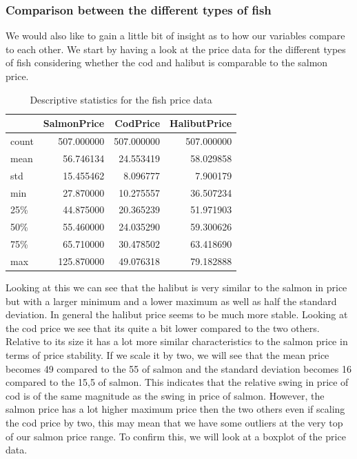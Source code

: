 \subsubsection{Comparison between the different types of fish}\label{Comparison between the different types of fish}
We would also like to gain a little bit of insight as to how our variables compare to each other. We start by having a look at the price data for the different types of fish considering whether the cod and halibut is comparable to the salmon price.

\begin{table}[H]
    \begin{center}
    \begin{tabular}{lrrr}
        \toprule
        {} &  SalmonPrice &    CodPrice &  HalibutPrice \\
        \midrule
        count &   507.000000 &  507.000000 &    507.000000 \\
        mean  &    56.746134 &   24.553419 &     58.029858 \\
        std   &    15.455462 &    8.096777 &      7.900179 \\
        min   &    27.870000 &   10.275557 &     36.507234 \\
        25\%   &    44.875000 &   20.365239 &     51.971903 \\
        50\%   &    55.460000 &   24.035290 &     59.300626 \\
        75\%   &    65.710000 &   30.478502 &     63.418690 \\
        max   &   125.870000 &   49.076318 &     79.182888 \\
        \bottomrule
    \end{tabular}
    \end{center}
    \caption{Descriptive statistics for the fish price data}
\end{table}

Looking at this we can see that the halibut is very similar to the salmon in price but with a larger minimum and a lower maximum as well as half the standard deviation. In general the halibut price seems to be much more stable. Looking at the cod price we see that its quite a bit lower compared to the two others. Relative to its size it has a lot more similar characteristics to the salmon price in terms of price stability. If we scale it by two, we will see that the mean price becomes 49 compared to the 55 of salmon and the standard deviation becomes 16 compared to the 15,5 of salmon. This indicates that the relative swing in price of cod is of the same magnitude as the swing in price of salmon. However, the salmon price has a lot higher maximum price then the two others even if scaling the cod price by two, this may mean that we have some outliers at the very top of our salmon price range. To confirm this, we will look at a boxplot of the price data.

